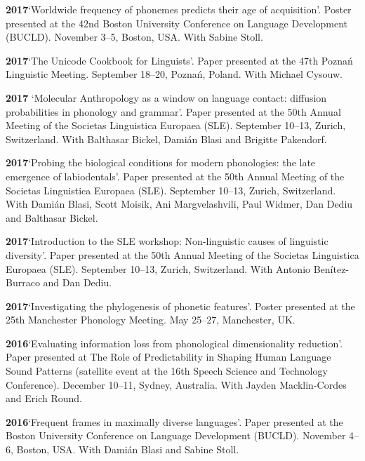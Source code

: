 \documentclass[11pt]{article}
\newcommand{\hangpara}{
 \setlength{\parindent}{0in} %
 \hangindent=0.42in %
}
\begin{document}
\vskip 6pt
\hangpara
{\bf 2017}\hspace{1ex}`Worldwide frequency of phonemes predicts their age of acquisition'. Poster presented at the 42nd Boston University Conference on Language Development (BUCLD). November 3--5, Boston, USA. With Sabine Stoll.

\vskip 6pt
\hangpara
{\bf 2017}\hspace{1ex}`The Unicode Cookbook for Linguists'. Paper presented at the 47th Pozna{\'n} Linguistic Meeting. September 18--20, Pozna{\'n}, Poland. With Michael Cysouw. 

\vskip 6pt
\hangpara
{\bf 2017}\hspace{1ex} `Molecular Anthropology as a window on language contact: diffusion probabilities in phonology and grammar'. Paper presented at the 50th Annual Meeting of the Societas Linguistica Europaea (SLE). September 10--13, Zurich, Switzerland. With Balthasar Bickel, Dami{\'a}n Blasi and Brigitte Pakendorf.
 
\vskip 6pt
\hangpara
{\bf 2017}\hspace{1ex}`Probing the biological conditions for modern phonologies: the late emergence of labiodentals'. Paper presented at the 50th Annual Meeting of the Societas Linguistica Europaea (SLE). September 10--13, Zurich, Switzerland. With Dami{\'a}n Blasi, Scott Moisik, Ani Margvelashvili, Paul Widmer, Dan Dediu and Balthasar Bickel.
\vskip 6pt
\hangpara
{\bf 2017}\hspace{1ex}`Introduction to the SLE workshop: Non-linguistic causes of linguistic diversity'. Paper presented at the 50th Annual Meeting of the Societas Linguistica Europaea (SLE). September 10--13, Zurich, Switzerland. With Antonio Benítez-Burraco and Dan Dediu.

\vskip 6pt
\hangpara
{\bf 2017}\hspace{1ex}`Investigating the phylogenesis of phonetic features'. Poster presented at the 25th Manchester Phonology Meeting. May 25--27, Manchester, UK.

\vskip 6pt
\hangpara
{\bf 2016}\hspace{1ex}`Evaluating information loss from phonological dimensionality reduction'. Paper presented at The Role of Predictability in Shaping Human Language Sound Patterns (satellite event at the 16th Speech Science and Technology Conference). December 10--11, Sydney, Australia. With Jayden Macklin-Cordes and Erich Round.

\vskip 6pt
\hangpara
{\bf 2016}\hspace{1ex}`Frequent frames in maximally diverse languages'. Paper presented at the Boston University Conference on Language Development (BUCLD). November 4--6, Boston, USA. With Dami{\'a}n Blasi and Sabine Stoll.
\end{document}
